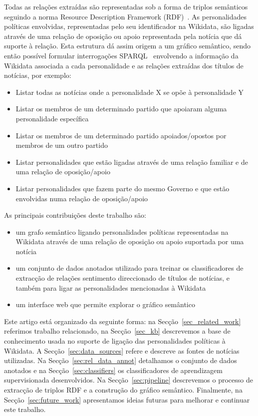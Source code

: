 \documentclass[a4paper, twocolumn, 11pt, twoside]{article}
\begin{document}
Todas as relações extraídas são representadas sob a forma de triplos semânticos seguindo a norma Resource Description Framework (RDF)~\citep{schreiber2014primer}. As personalidades políticas envolvidas, representadas pelo seu identificador na Wikidata, são ligadas através de uma relação de oposição ou apoio representada pela notícia que dá suporte à relação. Esta estrutura dá assim origem a um gráfico semântico, sendo então possível formular interrogações SPARQL~\citep{2013sparql} envolvendo a informação da Wikidata associada a cada personalidade e as relações extraídas dos títulos de notícias, por exemplo:

\begin{itemize}
\item{Listar todas as notícias onde a personalidade X se opõe à personalidade Y}
\item{Listar os membros de um determinado partido que apoiaram alguma personalidade específica}
\item{Listar os membros de um determinado partido apoiados/opostos por membros de um outro partido}
\item{Listar personalidades que estão ligadas através de uma relação familiar e de uma relação de oposição/apoio}
\item{Listar personalidades que fazem parte do mesmo Governo e que estão envolvidas numa relação de oposição/apoio}
\end{itemize}

As principais contribuições deste trabalho são: 

\begin{itemize}
\item{um grafo semântico ligando personalidades políticas representadas na Wikidata através de uma relação de oposição ou apoio suportada por uma notícia}
\item{um conjunto de dados anotados utilizado para treinar os classificadores de extracção de relações sentimento direccionado de títulos de notícias, e também para ligar as personalidades mencionadas à Wikidata}
\item{um interface web que permite explorar o gráfico semântico}
\end{itemize}

Este artigo está organizado da seguinte forma: na Secção~\ref{sec_related_work} referimos trabalho relacionado, na Secção~\ref{sec_kb} descrevemos a base de conhecimento usada no suporte de ligação das personalidades políticas à Wikidata. A Secção~\ref{sec:data_sources} refere e descreve as fontes de notícias utilizadas. Na Secção~\ref{sec:rel_data_annot} detalhamos o conjunto de dados anotados e na Secção~\ref{sec:classifiers} os classificadores de aprendizagem supervisionada desenvolvidos. Na Secção~\ref{sec:pipeline} descrevemos o processo de extracção de triplos RDF e a construção do gráfico semântico. Finalmente, na Secção~\ref{sec:future_work} apresentamos ideias futuras para melhorar e continuar este trabalho.
\end{document}
